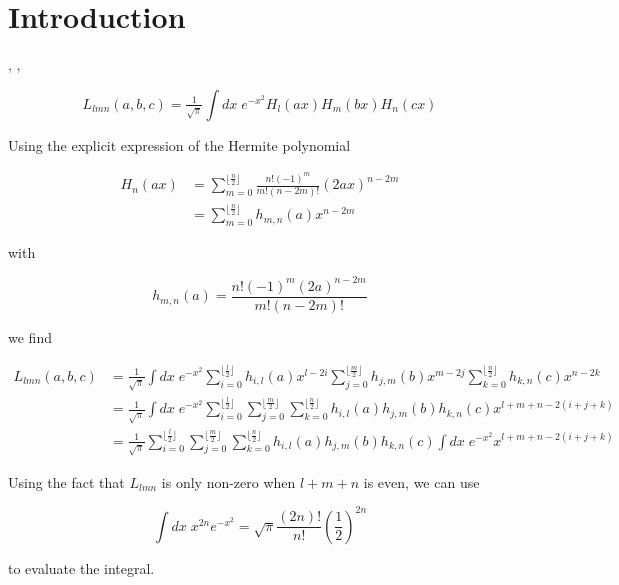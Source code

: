\chapter{Introduction}
\citep{Kuijken_2008}, \cite{Refregier_2003_1}, \cite{Refregier_2003_2} \cite{Kuijken_2015}

\begin{equation}
    L_{lmn}(a,b,c) = \tfrac{1}{\sqrt{\pi}}\int dx\; e^{-x^2}H_l(ax)H_m(bx)H_n(cx)
\end{equation}

Using the explicit expression of the Hermite polynomial

\begin{align}
    H_n(ax)&=\sum_{m=0}^{\lfloor\frac{n}{2}\rfloor}\frac{n!(-1)^m}{m!(n-2m)!}(2ax)^{n-2m}\\&=\sum_{m=0}^{\lfloor\frac{n}{2}\rfloor}h_{m,n}(a)x^{n-2m}
\end{align}

with 

\begin{equation}
    h_{m,n}(a)=\frac{n!(-1)^m(2a)^{n-2m}}{m!(n-2m)!}
\end{equation}

we find

\begin{align}
    L_{lmn}(a,b,c) &= \tfrac{1}{\sqrt{\pi}}\int dx\; e^{-x^2}\sum_{i=0}^{\lfloor\frac{l}{2}\rfloor}h_{i,l}(a)x^{l-2i}\sum_{j=0}^{\lfloor\frac{m}{2}\rfloor}h_{j,m}(b)x^{m-2j}\sum_{k=0}^{\lfloor\frac{n}{2}\rfloor}h_{k,n}(c)x^{n-2k}\\
     &= \tfrac{1}{\sqrt{\pi}}\int dx\; e^{-x^2}\sum_{i=0}^{\lfloor\frac{l}{2}\rfloor}\sum_{j=0}^{\lfloor\frac{m}{2}\rfloor}\sum_{k=0}^{\lfloor\frac{n}{2}\rfloor}h_{i,l}(a)h_{j,m}(b)h_{k,n}(c)x^{l+m+n-2(i+j+k)}\\
     &= \tfrac{1}{\sqrt{\pi}}\sum_{i=0}^{\lfloor\frac{l}{2}\rfloor}\sum_{j=0}^{\lfloor\frac{m}{2}\rfloor}\sum_{k=0}^{\lfloor\frac{n}{2}\rfloor}h_{i,l}(a)h_{j,m}(b)h_{k,n}(c)\int dx\; e^{-x^2}x^{l+m+n-2(i+j+k)}
\end{align}

Using the fact that $L_{lmn}$ is only non-zero when $l+m+n$ is even, we can use

\begin{equation}
    \int dx\;x^{2n}e^{-x^2}=\sqrt{\pi}\frac{(2n)!}{n!}\left(\frac{1}{2}\right)^{2n}
\end{equation}

to evaluate the integral.


